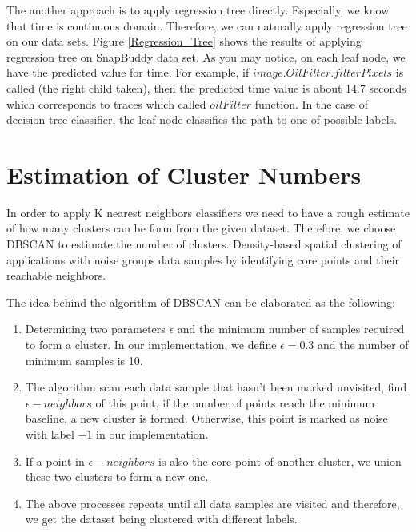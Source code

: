 \documentclass{article}
\begin{document}
The another approach is to apply regression tree directly. Especially,
we know that time is continuous domain. Therefore, we can naturally
apply regression tree on our data sets. Figure \ref{Regression_Tree}
shows the results of applying regression tree on SnapBuddy data set.
As you may notice, on each leaf node, we have the predicted value for
time. For example, if $image.OilFilter.filterPixels$ is called (the right child taken), 
then the predicted time value is about 14.7 seconds which corresponds to
traces which called $oilFilter$ function. In the case of decision tree classifier,
the leaf node classifies the path to one of possible labels. 



\section{Estimation of Cluster Numbers}

In order to apply K nearest neighbors classifiers we need to have a rough estimate of how many clusters can be form from the given dataset. Therefore, we choose DBSCAN to estimate the number of clusters. Density-based spatial clustering of applications with noise groups data samples by identifying core points and their reachable neighbors.

The idea behind the algorithm of DBSCAN can be elaborated as the following:

\begin{enumerate}
    \item
    Determining two parameters $\epsilon$ and the minimum number of samples required to form a cluster. In our implementation, we define $\epsilon=0.3$ and the number of minimum samples is 10.

    \item
    The algorithm scan each data sample that hasn't been marked unvisited, find $\epsilon-neighbors$ of this point, if the number of points reach the minimum baseline, a new cluster is formed. Otherwise, this point is marked as noise with label $-1$ in our implementation.

    \item
    If a point in $\epsilon-neighbors$ is also the core point of another cluster, we union these two clusters to form a new one.

    \item
    The above processes repeats until all data samples are visited and therefore, we get the dataset being clustered with different labels.
\end{enumerate}
\end{document}
